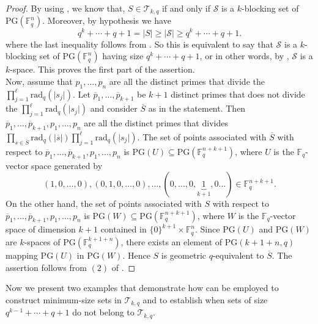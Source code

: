 \documentclass[12pt]{amsart}
\newcommand{\F}{{\mathbb F}}
\newcommand{\PG}{\mathrm{PG}}
\newcommand{\rad}{\mathrm{rad}_q}
\begin{document}
\begin{proof}
By using , we know that, $S \in \mathcal{T}_{k,q}$ if and only if 
$\mathcal{S}$ is a $k$-blocking set of $\PG(\F_{q}^{n})$. Moreover, by hypothesis we have 
\[
q^k+\cdots +q +1 = \lvert S \rvert \geq \lvert \mathcal{S} \rvert \geq q^k+\cdots +q +1.
\]
where the last inequality follows from . So this is equivalent to say that $\mathcal{S}$ is a $k$-blocking set of $\PG(\F_q^n)$ having size $q^k+\cdots+q+1$, or in other words, by , $\mathcal{S}$ is a $k$-space. This proves the first part of the assertion. \\
Now, assume that $p_1,\ldots,p_n$ are all the distinct primes that divide the $\prod_{j=1}^{\ell}\rad(\lvert s_j\rvert)$. Let $\overline{p}_1,\ldots,\overline{p}_{k+1}$ be $k+1$ distinct primes that does not divide the $\prod_{j=1}^{\ell}\rad(\lvert s_j\rvert)$ and consider $\overline{S}$ as in the statement. Then $\overline{p}_1,\ldots,\overline{p}_{k+1},p_1,\ldots,p_n$ are all the distinct primes that divides $\prod_{\overline{s} \in \overline{S}}\rad(\lvert \overline{s}\rvert)\prod_{j=1}^{\ell}\rad(\lvert s_j\rvert)$. The set of points associated with $\overline{S}$ with respect to $\overline{p}_1,\ldots,\overline{p}_{k+1},p_1,\ldots,p_n$ is $\PG(U) \subseteq \PG(\F_q^{n+k+1})$, where $U$ is the $\F_q$-vector space generated by
\[
(1,0,\ldots,0), (0,1,0,\ldots,0),\ldots,(0,\ldots,0,\underbrace{1}_{k+1},0\ldots ) \in \F_q^{n+k+1}. 
\] 
On the other hand, the set of points associated with $S$ with respect to $\overline{p}_1,\ldots,\overline{p}_{k+1},p_1,\ldots,p_n$ is $\PG(W) \subseteq \PG(\F_q^{n+k+1})$, where $W$ is the $\F_q$-vector space of dimension $k+1$ contained in $\{0\}^{k+1} \times \F_q^n$. Since $\PG(U)$ and $\PG(W)$ are $k$-spaces of $\PG(\F_q^{k+1+n})$, there exists an element of $\PG(k+1+n,q)$ mapping $\PG(U)$ in $\PG(W)$. Hence $S$ is geometric $q$-equivalent to $\overline{S}$.
The assertion follows from $(2)$ of .
\end{proof}


Now we present two examples that demonstrate how  can be employed to construct minimum-size sets in $\mathcal{T}_{k,q}$ and to establish when sets of size $q^{k-1}+\cdots+q+1$ do not belong to $\mathcal{T}_{k,q}$.
\end{document}
